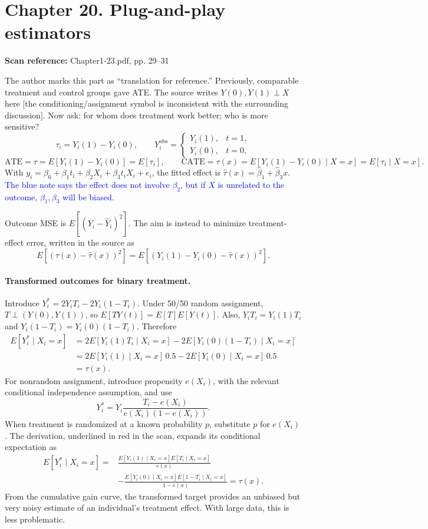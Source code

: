 \documentclass[11pt,a4paper]{article}
\newcommand{\sourcepages}[1]{\par{\small\sffamily\color{muted}\textbf{Scan reference:} #1\par}\nobreak\smallskip\nopagebreak[4]}
\newcommand{\inkblue}[1]{\textcolor{blue}{#1}}
\begin{document}
{\section{Chapter 20. Plug-and-play estimators}
\sourcepages{Chapter1-23.pdf, pp. 29--31}
The author marks this part as ``translation for reference.'' Previously, comparable treatment and control groups gave ATE. The source writes $Y(0),Y(1)\perp X$ here [the conditioning/assignment symbol is inconsistent with the surrounding discussion]. Now ask: for whom does treatment work better; who is more sensitive?
\[\tau_i=Y_i(1)-Y_i(0),\qquad
Y_i^{\mathrm{obs}}=\begin{cases}Y_i(1),&t=1,\\Y_i(0),&t=0,\end{cases}
\]
\[\mathrm{ATE}=\tau=E[Y_i(1)-Y_i(0)]=E[\tau_i],\qquad
\mathrm{CATE}=\tau(x)=E[Y_i(1)-Y_i(0)\mid X=x]=E[\tau_i\mid X=x].\]
With $y_i=\beta_0+\beta_1t_i+\beta_2X_i+\beta_3t_iX_i+e_i$, the fitted effect is $\hat\tau(x)=\hat\beta_1+\hat\beta_3x$. \inkblue{The blue note says the effect does not involve $\beta_2$, but if $X$ is unrelated to the outcome, $\beta_1,\beta_3$ will be biased.}

Outcome MSE is $E[(Y_i-\hat Y_i)^2]$. The aim is instead to minimize treatment-effect error, written in the source as
\[E[(\tau(x)-\hat\tau(x))^2]=E[(Y_i(1)-Y_i(0)-\hat\tau(x))^2].\]


\paragraph{Transformed outcomes for binary treatment.}
Introduce $Y_i^*=2Y_iT_i-2Y_i(1-T_i)$. Under 50/50 random assignment, $T\perp(Y(0),Y(1))$, so $E[TY(t)]=E[T]E[Y(t)]$. Also, $Y_iT_i=Y_i(1)T_i$ and $Y_i(1-T_i)=Y_i(0)(1-T_i)$. Therefore
\begin{align*}
E[Y_i^*\mid X_i=x]
&=2E[Y_i(1)T_i\mid X_i=x]-2E[Y_i(0)(1-T_i)\mid X_i=x]\\
&=2E[Y_i(1)\mid X_i=x]\,0.5-2E[Y_i(0)\mid X_i=x]\,0.5\\
&=\tau(x).
\end{align*}
For nonrandom assignment, introduce propensity $e(X_i)$, with the relevant conditional independence assumption, and use
\[Y_i^*=Y_i\frac{T_i-e(X_i)}{e(X_i)(1-e(X_i))}.\]
When treatment is randomized at a known probability $p$, substitute $p$ for $e(X_i)$. The derivation, underlined in red in the scan, expands its conditional expectation as
\begin{align*}
E[Y_i^*\mid X_i=x]
={}&\frac{E[Y_i(1)\mid X_i=x]E[T_i\mid X_i=x]}{e(x)}\\
&-\frac{E[Y_i(0)\mid X_i=x]E[1-T_i\mid X_i=x]}{1-e(x)}=\tau(x).
\end{align*}
From the cumulative gain curve, the transformed target provides an unbiased but very noisy estimate of an individual's treatment effect. With large data, this is less problematic.

}
\end{document}
